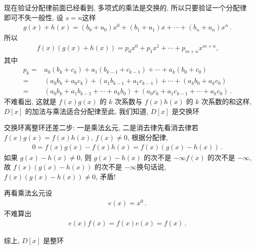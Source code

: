 \begin{pf}
    现在验证分配律\period 前面已经看到, 多项式的乘法是交换的, 所以只要验证一个分配律即可\period 不失一般性, 设 $s=n$\period 这样
    \begin{align*}
        g(x) + h(x) = (b_0 + u_0) x^0 + (b_1 + u_1) x + \cdots + (b_n + u_n) x^n \period
    \end{align*}
    所以
    \begin{align*}
        f(x) (g(x) + h(x)) = p_0 x^0 + p_1 x^1 + \cdots + p_{m+n} x^{m+n},
    \end{align*}
    其中
    \begin{align*}
        p_k
        = {} & a_0 (b_k + c_k) + a_1 (b_{k-1} + c_{k-1}) + \cdots + a_k (b_0 + c_0)                            \\
        = {} & (a_0 b_k + a_0 c_k) + (a_1 b_{k-1} + a_1 c_{k-1}) + \cdots + (a_k b_0 + a_k c_0)                \\
        = {} & (a_0 b_k + a_1 b_{k-1} + \cdots + a_k b_0) + (a_0 c_k + a_1 c_{k-1} + \cdots + a_k c_0) \period
    \end{align*}
    不难看出, 这就是 $f(x)g(x)$ 的 $k$ 次系数与 $f(x)h(x)$ 的 $k$ 次系数的和\period 这样, $D[x]$ 的加法与乘法适合分配律\period 至此, 我们知道, $D[x]$ 是交换环\period

    交换环离整环还差二步: 一是乘法幺元, 二是消去律\period 先看消去律\period 若 $f(x)g(x) = f(x)h(x)$, $f(x) \neq 0$, 根据分配律,
    \begin{align*}
        0 = f(x)g(x) - f(x)h(x) = f(x) (g(x) - h(x)) \period
    \end{align*}
    如果 $g(x) - h(x) \neq 0$, 则 $g(x) - h(x)$ 的次不是 $-\infty$\period $f(x)$ 的次不是 $-\infty$, 故 $f(x)(g(x) - h(x))$ 的次不是 $-\infty$\period 换句话说, $f(x)(g(x) - h(x)) \neq 0$, 矛盾!

    再看乘法幺元\period 设
    \begin{align*}
        e(x) = x^0 \period
    \end{align*}
    不难算出
    \begin{align*}
        e(x) f(x) = f(x) e(x) = f(x) \period
    \end{align*}

    综上, $D[x]$ 是整环\period
\end{pf}

